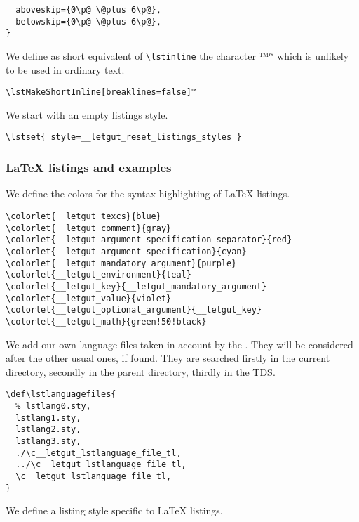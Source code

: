 \documentclass{letgut}
\begin{document}
\begin{lstlisting}
  aboveskip={0\p@ \@plus 6\p@},
  belowskip={0\p@ \@plus 6\p@},
}
\end{lstlisting}

We define as short equivalent of \lstinline+\lstinline+ the character
\lstDeleteShortInline™\texttt{™} which is unlikely to be used in ordinary text.

\begin{lstlisting}
\lstMakeShortInline[breaklines=false]™
\end{lstlisting}

We start with an empty listings style.

\begin{lstlisting}
\lstset{ style=__letgut_reset_listings_styles }
\end{lstlisting}

\subsubsection{\LaTeX{} listings and examples}
\label{ImplementationListingsLaTeXlistingsandexamples-xt4h55h0jlj0}
We define the colors for the syntax highlighting of \LaTeX{} listings.

\begin{lstlisting}
\colorlet{__letgut_texcs}{blue}
\colorlet{__letgut_comment}{gray}
\colorlet{__letgut_argument_specification_separator}{red}
\colorlet{__letgut_argument_specification}{cyan}
\colorlet{__letgut_mandatory_argument}{purple}
\colorlet{__letgut_environment}{teal}
\colorlet{__letgut_key}{__letgut_mandatory_argument}
\colorlet{__letgut_value}{violet}
\colorlet{__letgut_optional_argument}{__letgut_key}
\colorlet{__letgut_math}{green!50!black}
\end{lstlisting}

We add our own language files taken in account by the . They
will be considered after the other usual ones, if found. They are searched firstly
in the current directory, secondly in the parent directory, thirdly in the TDS.

\begin{lstlisting}
\def\lstlanguagefiles{
  % lstlang0.sty,
  lstlang1.sty,
  lstlang2.sty,
  lstlang3.sty,
  ./\c__letgut_lstlanguage_file_tl,
  ../\c__letgut_lstlanguage_file_tl,
  \c__letgut_lstlanguage_file_tl,
}
\end{lstlisting}

We define a listing style specific to \LaTeX{} listings.
\end{document}
